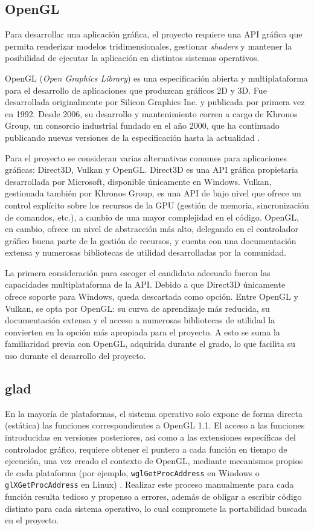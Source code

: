 \subsection{OpenGL}

Para desarrollar una aplicación gráfica, el proyecto requiere una API gráfica que permita renderizar modelos tridimensionales, gestionar \textit{shaders} y mantener la posibilidad de ejecutar la aplicación en distintos sistemas operativos.

OpenGL (\emph{Open Graphics Library}) es una especificación abierta y multiplataforma para el desarrollo de aplicaciones que produzcan gráficos 2D y 3D. Fue desarrollada originalmente por Silicon Graphics Inc. y publicada por primera vez en 1992. Desde 2006, su desarrollo y mantenimiento corren a cargo de Khronos Group, un consorcio industrial fundado en el año 2000, que ha continuado publicando nuevas versiones de la especificación hasta la actualidad \cite{opengl, openGL_history}.

Para el proyecto se consideran varias alternativas comunes para aplicaciones gráficas: Direct3D, Vulkan y OpenGL. Direct3D es una API gráfica propietaria desarrollada por Microsoft, disponible únicamente en Windows. Vulkan, gestionada también por Khronos Group, es una API de bajo nivel que ofrece un control explícito sobre los recursos de la GPU (gestión de memoria, sincronización de comandos, etc.), a cambio de una mayor complejidad en el código. OpenGL, en cambio, ofrece un nivel de abstracción más alto, delegando en el controlador gráfico buena parte de la gestión de recursos, y cuenta con una documentación extensa y numerosas bibliotecas de utilidad desarrolladas por la comunidad.

La primera consideración para escoger el candidato adecuado fueron las capacidades multiplataforma de la API. Debido a que Direct3D únicamente ofrece soporte para Windows, queda descartada como opción. Entre OpenGL y Vulkan, se opta por OpenGL: su curva de aprendizaje más reducida, su documentación extensa y el acceso a numerosas bibliotecas de utilidad la convierten en la opción más apropiada para el proyecto. A esto se suma la familiaridad previa con OpenGL, adquirida durante el grado, lo que facilita su uso durante el desarrollo del proyecto.

\subsection{glad}

En la mayoría de plataformas, el sistema operativo solo expone de forma directa (estática) las funciones correspondientes a OpenGL 1.1. El acceso a las funciones introducidas en versiones posteriores, así como a las extensiones específicas del controlador gráfico, requiere obtener el puntero a cada función en tiempo de ejecución, una vez creado el contexto de OpenGL, mediante mecanismos propios de cada plataforma (por ejemplo, \texttt{wglGetProcAddress} en Windows o \texttt{glXGetProcAddress} en Linux) \cite{opengl-loading}. Realizar este proceso manualmente para cada función resulta tedioso y propenso a errores, además de obligar a escribir código distinto para cada sistema operativo, lo cual compromete la portabilidad buscada en el proyecto.

